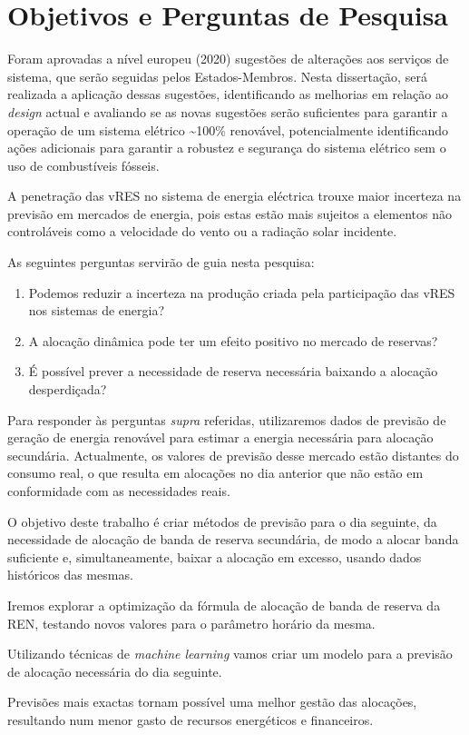 \section{Objetivos e Perguntas de Pesquisa\label{se:objetivos}}

Foram aprovadas a nível europeu (2020)\cite{52020DC0299} sugestões de alterações aos serviços de sistema, que serão seguidas pelos Estados-Membros. Nesta dissertação, será realizada a aplicação dessas sugestões, identificando as melhorias em relação ao \textit{design} actual e avaliando se as novas sugestões serão suficientes para garantir a operação de um sistema elétrico \textasciitilde100\% renovável, potencialmente identificando ações adicionais para garantir a robustez e segurança do sistema elétrico sem o uso de combustíveis fósseis.\par
A penetração das \gls{vRES} no sistema de energia eléctrica trouxe maior incerteza na previsão em mercados de energia, pois estas estão mais sujeitos a elementos não controláveis como a velocidade do vento ou a radiação solar incidente.\par
As seguintes perguntas servirão de guia nesta pesquisa:\par

\begin{enumerate}[label=\alph*)]
  \item Podemos reduzir a incerteza na produção criada pela participação das \gls{vRES} nos sistemas de energia? 
  \item A alocação dinâmica pode ter um efeito positivo no mercado de reservas?
  \item É possível prever a necessidade de reserva necessária baixando a alocação desperdiçada?
\end{enumerate}

Para responder às perguntas \textit{supra} referidas, utilizaremos dados de previsão de geração de energia renovável para estimar a energia necessária para alocação secundária. Actualmente, os valores de previsão desse mercado estão distantes do consumo real, o que resulta em alocações no dia anterior que não estão em conformidade com as necessidades reais.\par
O objetivo deste trabalho é criar métodos de previsão para o dia seguinte, da necessidade de alocação de banda de reserva secundária, de modo a alocar banda suficiente e, simultaneamente, baixar a alocação em excesso, usando dados históricos das mesmas.\par
Iremos explorar a optimização da fórmula de alocação de banda de reserva da REN, testando novos valores para o parâmetro horário da mesma.\par
Utilizando técnicas de \textit{machine learning} vamos criar um modelo para a previsão de alocação necessária do dia seguinte.\par
Previsões mais exactas tornam possível uma melhor gestão das alocações, resultando num menor gasto de recursos energéticos e financeiros.\par


